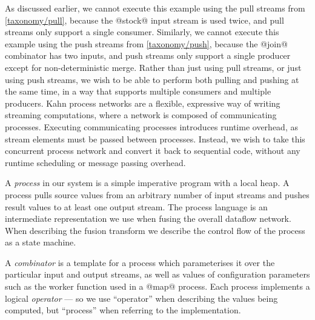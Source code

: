 As discussed earlier, we cannot execute this example using the pull streams from \cref{taxonomy/pull}, because the @stock@ input stream is used twice, and pull streams only support a single consumer.
Similarly, we cannot execute this example using the push streams from \cref{taxonomy/push}, because the @join@ combinator has two inputs, and push streams only support a single producer except for non-deterministic merge.
Rather than just using pull streams, or just using push streams, we wish to be able to perform both pulling and pushing at the same time, in a way that supports multiple consumers and multiple producers.
Kahn process networks \citep{kahn1976coroutines} are a flexible, expressive way of writing streaming computations, where a network is composed of communicating processes.
Executing communicating processes introduces runtime overhead, as stream elements must be passed between processes.
Instead, we wish to take this concurrent process network and convert it back to sequential code, without any runtime scheduling or message passing overhead.

%

A \emph{process} in our system is a simple imperative program with a local heap.
A process pulls source values from an arbitrary number of input streams and pushes result values to at least one output stream.
The process language is an intermediate representation we use when fusing the overall dataflow network.
When describing the fusion transform we describe the control flow of the process as a state machine.

A \emph{combinator} is a template for a process which parameterises it over the particular input and output streams, as well as values of configuration parameters such as the worker function used in a @map@ process.
Each process implements a logical \emph{operator} --- so we use ``operator'' when describing the values being computed, but ``process'' when referring to the implementation.


